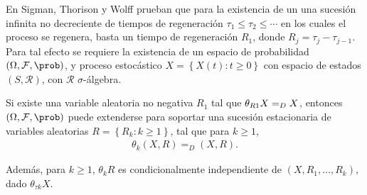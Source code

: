 
En Sigman, Thorison y Wolff \cite{Sigman2} prueban que para la existencia de un una sucesi\'on infinita no decreciente de tiempos de regeneraci\'on $\tau_{1}\leq\tau_{2}\leq\cdots$ en los cuales el proceso se regenera, basta un tiempo de regeneraci\'on $R_{1}$, donde $R_{j}=\tau_{j}-\tau_{j-1}$. Para tal efecto se requiere la existencia de un espacio de probabilidad $\left(\Omega,\mathcal{F},\prob\right)$, y proceso estoc\'astico $\textit{X}=\left\{X\left(t\right):t\geq0\right\}$ con espacio de estados $\left(S,\mathcal{R}\right)$, con $\mathcal{R}$ $\sigma$-\'algebra.

\begin{Prop}
Si existe una variable aleatoria no negativa $R_{1}$ tal que $\theta_{R\footnotesize{1}}X=_{D}X$, entonces $\left(\Omega,\mathcal{F},\prob\right)$ puede extenderse para soportar una sucesi\'on estacionaria de variables aleatorias $R=\left\{R_{k}:k\geq1\right\}$, tal que para $k\geq1$,
\begin{eqnarray*}
\theta_{k}\left(X,R\right)=_{D}\left(X,R\right).
\end{eqnarray*}

Adem\'as, para $k\geq1$, $\theta_{k}R$ es condicionalmente independiente de $\left(X,R_{1},\ldots,R_{k}\right)$, dado $\theta_{\tau k}X$.

\end{Prop}


